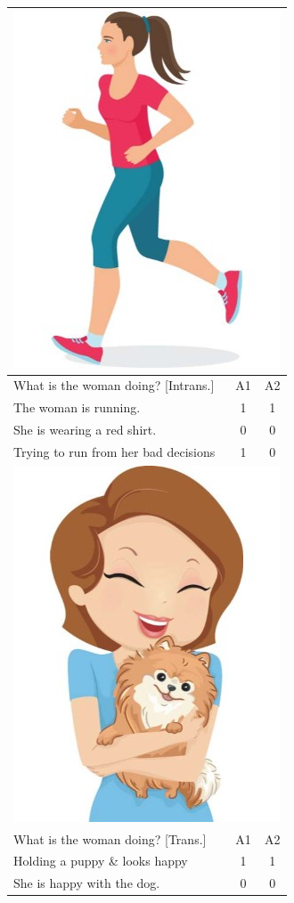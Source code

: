 \documentclass[11pt,a4paper]{article}
\begin{document}
\begin{table}[htb!]
\begin{center}
\begin{tabular}{|l|c|c|}
\hline
\multicolumn{3}{|c|}{\includegraphics[width=0.35\columnwidth]{figures/I30.jpg}} \\
\hline
What is the woman doing? [Intrans.] & A1 & A2 \\
\hline
The woman is running. & 1 & 1 \\
\hline
She is wearing a red shirt. & 0 & 0 \\
\hline
Trying to run from her bad decisions & 1 & 0 \\
\hline
\hline
\multicolumn{3}{|c|}{\includegraphics[width=0.35\columnwidth]{figures/I29.jpg}} \\
\hline
What is the woman doing? [Trans.] & A1 & A2 \\
\hline
Holding a puppy \& looks happy & 1 & 1 \\
\hline
She is happy with the dog. & 0 & 0 \\

\end{tabular}
\end{center}
\end{table}
\end{document}
